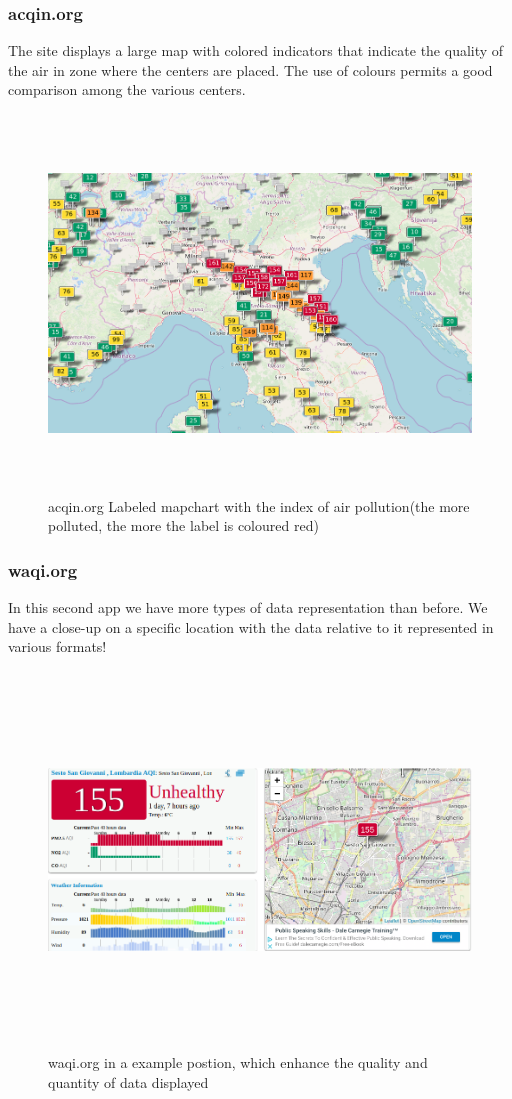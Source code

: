 \documentclass[12pt]{article} %
\begin{document}
\begin{itemize}
\subsubsection{acqin.org}
The site displays a large map with colored indicators that indicate the quality of the air in zone where the centers are placed. The use of colours permits a good comparison among the various centers.
\begin{figure}[H]
  \centering
  \hfill
  \includegraphics[width=25cm,height=10cm,keepaspectratio]{img/aqicn.png}
  \caption{acqin.org Labeled mapchart with the index of air pollution(the more polluted, the more the label is coloured red)}
  \label{fig:boat3}
\end{figure}
\subsubsection{waqi.org}
In this second app we have more types of data representation than before. We have a close-up on a specific location with the data relative to it represented in various formats!
\begin{figure}[H]
  \centering
  \includegraphics[width=15cm,height=10cm,keepaspectratio]{img/TechnicalExample.png}
  \caption{waqi.org in a example postion, which enhance the quality and quantity of data displayed}
  \label{fig:boat3}
\end{figure}


\end{itemize}
\end{document}
